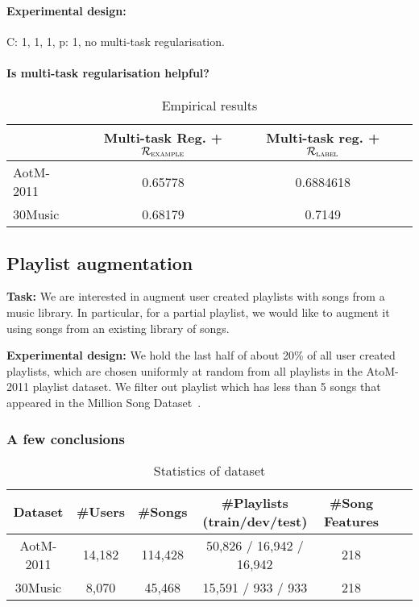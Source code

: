 \paragraph{Experimental design:}
C: 1, 1, 1, p: 1, no multi-task regularisation.

\paragraph{Is multi-task regularisation helpful?}

\begin{table}[!h]
\centering
\caption{Empirical results}
\begin{tabular}{l|ccc}
\toprule
{}            & Multi-task Reg. + $\mathcal{R}_\textsc{example}$ & Multi-task reg. + $\mathcal{R}_\textsc{label}$ \\
\midrule
AotM-2011     & 0.65778     & 0.6884618 \\
30Music       & 0.68179     & 0.7149 \\
\bottomrule
\end{tabular}
\end{table}



\subsection{Playlist augmentation}

{\bf Task:}
We are interested in augment user created playlists with songs from a music library.
In particular, for a partial playlist, we would like to augment it using songs from an existing library of songs.

{\bf Experimental design:}
We hold the last half of about 20\% of all user created playlists, 
which are chosen uniformly at random from all playlists in the AtoM-2011 playlist dataset.
We filter out playlist which has less than 5 songs that appeared in the Million Song Dataset~\cite{}.


\subsubsection{A few conclusions}
\begin{table}[!h]
\centering
\caption{Statistics of dataset}
\begin{tabular}{ccccccc}
\toprule
Dataset & \#Users & \#Songs & \#Playlists (train/dev/test)  & \#Song Features \\
\midrule
AotM-2011 & 14,182 & 114,428 & 50,826 / 16,942 / 16,942 & 218 \\
30Music   & 8,070  & 45,468  & 15,591 / 933 / 933       & 218 \\
\bottomrule
\end{tabular}
\end{table}


